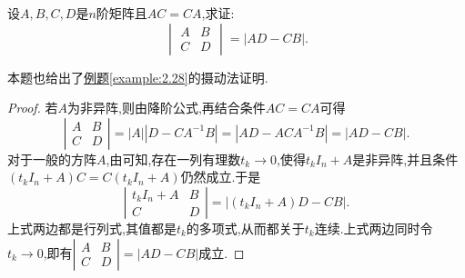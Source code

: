 \documentclass[../../main.tex]{subfiles}
\begin{document}
\begin{example}
设\(A,B,C,D\)是\(n\)阶矩阵且\(AC = CA\),求证:
\[
\begin{vmatrix}
A & B\\
C & D
\end{vmatrix}=|AD - CB|.
\]
\end{example}
\begin{note}
本题也给出了\hyperref[example:2.28]{例题\ref{example:2.28}}的摄动法证明.
\end{note}
\begin{proof}
若\(A\)为非异阵,则由降阶公式,再结合条件\(AC = CA\)可得
\[
\left|\begin{matrix}
A & B\\
C & D
\end{matrix}\right| = |A|\left|D - CA^{-1}B\right| = \left|AD - ACA^{-1}B\right| = |AD - CB|.
\]
对于一般的方阵\(A\),由可知,存在一列有理数\(t_k\rightarrow 0\),使得\(t_kI_n + A\)是非异阵,并且条件\((t_kI_n + A)C = C(t_kI_n + A)\)仍然成立.于是
\[
\left|\begin{matrix}
t_kI_n + A & B\\
C & D
\end{matrix}\right| = \left|(t_kI_n + A)D - CB\right|.
\]
上式两边都是行列式,其值都是\(t_k\)的多项式,从而都关于\(t_k\)连续.上式两边同时令\(t_k\rightarrow 0\),即有\(\left|\begin{matrix}
A & B\\
C & D
\end{matrix}\right| = |AD - CB|\)成立.
\end{proof}
\end{document}
